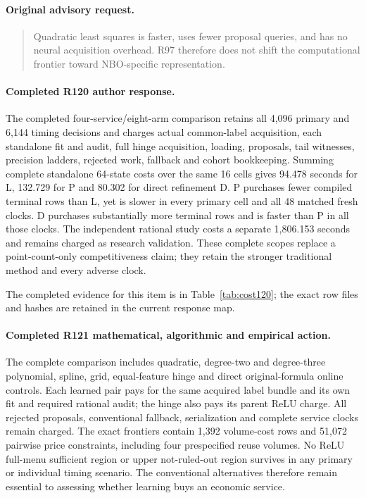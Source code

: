 \paragraph{Original advisory request.}
\begin{quote}
Quadratic least squares is faster, uses fewer proposal queries, and has no neural acquisition overhead. R97 therefore does not shift the computational frontier toward NBO-specific representation.
\end{quote}

\paragraph{Completed R120 author response.}
The completed four-service/eight-arm comparison retains all 4,096 primary and 6,144 timing decisions and charges actual common-label acquisition, each standalone fit and audit, full hinge acquisition, loading, proposals, tail witnesses, precision ladders, rejected work, fallback and cohort bookkeeping. Summing complete standalone 64-state costs over the same 16 cells gives 94.478 seconds for L, 132.729 for P and 80.302 for direct refinement D. P purchases fewer compiled terminal rows than L, yet is slower in every primary cell and all 48 matched fresh clocks. D purchases substantially more terminal rows and is faster than P in all those clocks. The independent rational study costs a separate 1,806.153 seconds and remains charged as research validation. These complete scopes replace a point-count-only competitiveness claim; they retain the stronger traditional method and every adverse clock.

The completed evidence for this item is in Table~\ref{tab:cost120}; the exact row files and hashes are retained in the current response map.

\paragraph{Completed R121 mathematical, algorithmic and empirical action.}
The complete comparison includes quadratic, degree-two and degree-three polynomial, spline, grid, equal-feature hinge and direct original-formula online controls. Each learned pair pays for the same acquired label bundle and its own fit and required rational audit; the hinge also pays its parent ReLU charge. All rejected proposals, conventional fallback, serialization and complete service clocks remain charged. The exact frontiers contain 1,392 volume-cost rows and 51,072 pairwise price constraints, including four prespecified reuse volumes. No ReLU full-menu sufficient region or upper not-ruled-out region survives in any primary or individual timing scenario. The conventional alternatives therefore remain essential to assessing whether learning buys an economic service.

